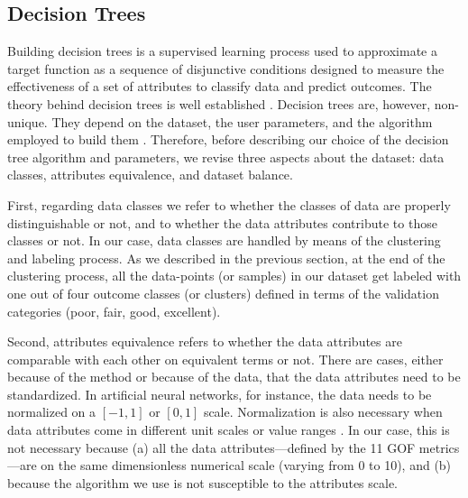 
\subsection{Decision Trees}
\label{sec:decision-tree}

Building decision trees is a supervised learning process used to approximate a target function as a sequence of disjunctive conditions designed to measure the effectiveness of a set of attributes to classify data and predict outcomes. The theory behind decision trees is well established \citep[e.g.,][]{Quinlan_1986_ML, Mitchell_1997_Book}. 
 Decision trees are, however, non-unique. They depend on the dataset, the user parameters, and the algorithm employed to build them \citep{Murthy_1998_DMKD}. Therefore, before describing our choice of the decision tree algorithm and parameters, we revise three aspects about the dataset: data classes, attributes equivalence, and dataset balance.

First, regarding data classes we refer to whether the classes of data are properly distinguishable or not, and to whether the data attributes contribute to those classes or not. In our case, data classes are handled by means of the clustering and labeling process. As we described in the previous section, at the end of the clustering process, all the data-points (or samples) in our dataset get labeled with one out of four outcome classes (or clusters) defined in terms of the validation categories (poor, fair, good, excellent).

Second, attributes equivalence refers to whether the data attributes are comparable with each other on equivalent terms or not. There are cases, either because of the method or because of the data, that the data attributes need to be standardized. In artificial neural networks, for instance, the data needs to be normalized on a $[-1,1]$ or $[0,1]$ scale. Normalization is also necessary when data attributes come in different unit scales or value ranges \citep[e.g.,][]{Wu_2010_JH}. In our case, this is not necessary because (a) all the data attributes---defined by the 11 GOF metrics---are on the same dimensionless numerical scale (varying from 0 to 10), and (b) because the algorithm we use is not susceptible to the attributes scale.


